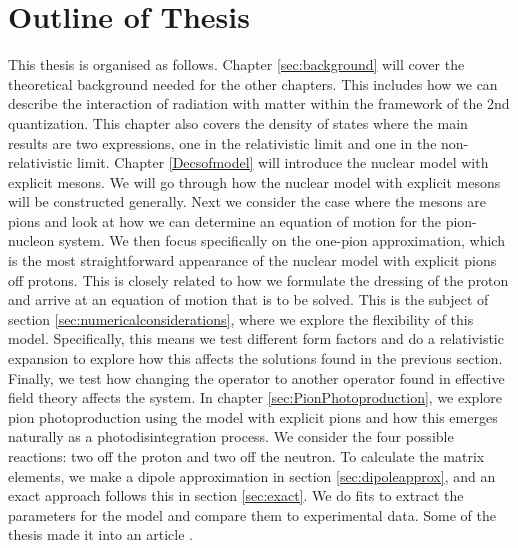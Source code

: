 \section{Outline of Thesis}
This thesis is organised as follows. Chapter \ref{sec:background} will cover the theoretical background needed for the other chapters. This includes how we can describe the interaction of radiation with matter within the framework of the 2nd quantization. This chapter also covers the density of states where the main results are two expressions, one in the relativistic limit and one in the non-relativistic limit. Chapter \ref{Decsofmodel} will introduce the nuclear model with explicit mesons. We will go through how the nuclear model with explicit mesons will be constructed generally. Next we consider the case where the mesons are pions and look at how we can determine an equation of motion for the pion-nucleon system. We then focus specifically on the one-pion approximation, which is the most straightforward appearance of the nuclear model with explicit pions off protons. This is closely related to how we formulate the dressing of the proton and arrive at an equation of motion that is to be solved. This is the subject of section \ref{sec:numericalconsiderations}, where we explore the flexibility of this model. Specifically, this means we test different form factors and do a relativistic expansion to explore how this affects the solutions found in the previous section. Finally, we test how changing the operator to another operator found in effective field theory affects the system. In chapter \ref{sec:PionPhotoproduction}, we explore pion photoproduction using the model with explicit pions and how this emerges naturally as a photodisintegration process. We consider the four possible reactions: two off the proton and two off the neutron. To calculate the matrix elements, we make a dipole approximation in section \ref{sec:dipoleapprox}, and an exact approach follows this in section \ref{sec:exact}. We do fits to extract the parameters for the model and compare them to experimental data. Some of the thesis made it into an article \cite{ThresholdPion}.
